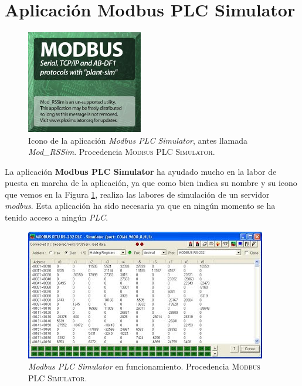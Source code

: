 \documentclass[pdftex,11pt,a4paper]{book}
\begin{document}
\section{Aplicación Modbus PLC Simulator}

\begin{figure}[h]
\begin{center}
\includegraphics[width=2in]{img/ModbusPLCSimulatorNewartwork.jpg}
\caption{\label{plc_mod}Icono de la aplicación \emph{Modbus PLC Simulator}, antes llamada \emph{Mod\_RSSim}. Procedencia \textsc{Modbus PLC Simulator}\cite{plcsimulator}.}
\end{center}
\end{figure}

La aplicación \textbf{Modbus PLC Simulator} \cite{plcsimulator} ha ayudado mucho en la labor de puesta en marcha de la aplicación, ya que como bien indica su nombre y su icono que vemos en la Figura \ref{plc_mod}, realiza las labores de simulación de un servidor \emph{modbus}. Esta aplicación ha sido necesaria ya que en ningún momento se ha tenido acceso a ningún \emph{PLC}.

\begin{figure}[h]
\begin{center}
\includegraphics[width=\textwidth]{img/ModbusPLCSimulatorRegistersscreen.jpg}
\caption{\label{plc_sim}\emph{Modbus PLC Simulator} en funcionamiento. Procedencia \textsc{Modbus PLC Simulator}\cite{plcsimulator}.}
\end{center}
\end{figure}
\end{document}
